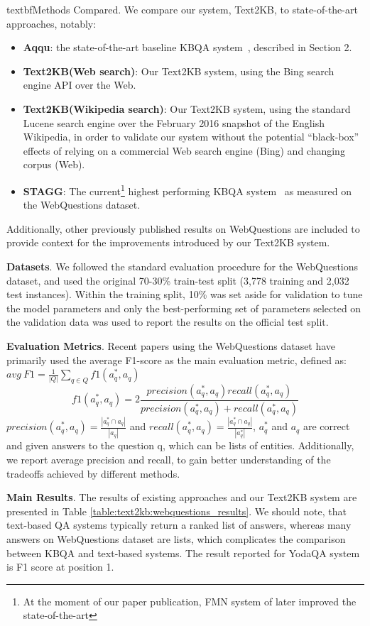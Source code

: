 textbf{Methods Compared}.
We compare our system, Text2KB, to state-of-the-art approaches, notably:
\begin{itemize}
\item{\textbf{Aqqu}}: the state-of-the-art baseline KBQA system~\cite{bastmore:cikm:2015:aquu}, described in Section 2.
\item{\textbf{Text2KB(Web search)}}: Our Text2KB system, using the Bing search engine API over the Web. 
\item{\textbf{Text2KB(Wikipedia search)}}: Our Text2KB system, using the standard Lucene search engine over the February 2016 snapshot of the English Wikipedia, in order to validate our system without the potential ``black-box'' effects of relying on a commercial Web search engine (Bing) and changing corpus (Web).
\item{\textbf{STAGG}}: The current\footnote{At the moment of our paper publication, FMN system of \cite{jain2016question} later improved the state-of-the-art} highest performing KBQA system~\cite{yih:ACL:2015:STAGG} as measured on the WebQuestions dataset.
\end{itemize}
Additionally, other previously published results on WebQuestions are included to provide context for the improvements introduced by our Text2KB system.

\textbf{Datasets}.
We followed the standard evaluation procedure for the WebQuestions dataset, and used the original 70-30\% train-test split (3,778 training and 2,032 test instances). Within the training split, 10\% was set aside for validation to tune the model parameters and only the best-performing set of parameters selected on the validation data was used to report the results on the official test split.

\textbf{Evaluation Metrics}. 
Recent papers using the WebQuestions dataset have primarily used the average F1-score as the main evaluation metric, defined as:
$avg\ F1 = \frac{1}{|Q|} \sum_{q \in Q} f1(a^*_q, a_q)$
$$f1(a^*_q, a_q) = 2\frac{precision(a^*_q,a_q) recall(a^*_q,a_q)}{precision(a^*_q,a_q) + recall(a^*_q,a_q)}$$
$precision(a^*_q, a_q)=\frac{|a^*_q \cap a_q|}{|a_q|}$ and $recall(a^*_q, a_q) = \frac{|a^*_q \cap a_q|}{|a^*_q|}$, $a^*_q$ and $a_q$ are correct and given answers to the question q, which can be lists of entities.
Additionally, we report average precision and recall, to gain better understanding of the tradeoffs achieved by different methods.

\textbf{Main Results}.
The results of existing approaches and our Text2KB system are presented in Table \ref{table:text2kb:webquestions_results}.
We should note, that text-based QA systems typically return a ranked list of answers, whereas many answers on WebQuestions dataset are lists, which complicates the comparison between KBQA and text-based systems.
The result reported for YodaQA system is F1 score at position 1.

